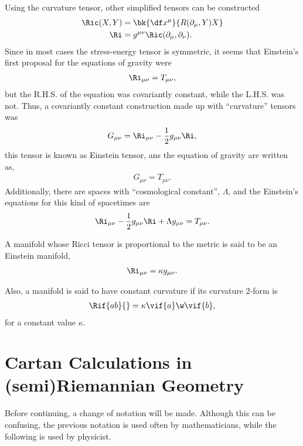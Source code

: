 Using the curvature tensor, other simplified tensors can be constructed
\begin{align}
  \Ric(X,Y) &= \bk{\df x^\mu}{R(\partial_\mu,Y)X}\\
  \Ri &= g^{\mu \nu}\Ric(\partial_\mu,\partial_\nu).
\end{align}
Since in most cases the stress-energy tensor is symmetric, it seems that Einstein's first proposal for the equations of gravity were
\begin{align}
  \Ri_{\mu\nu}=T_{\mu\nu},
\end{align}
but the R.H.S. of the equation was covariantly constant, while the L.H.S. was not. Thus, a covariantly constant construction made up with ``curvature'' tensors was
\begin{align}
  G_{\mu\nu} = \Ri_{\mu\nu}-\frac{1}{2}g_{\mu\nu}\Ri,
\end{align}
this tensor is known as Einstein tensor, ans the equation of gravity are written as,
\begin{align}
  G_{\mu\nu}= T_{\mu\nu}.
\end{align}
Additionally, there are spaces with ``cosmological constant'', $\Lambda$, and the Einstein's equations for this kind of spacetimes are
\begin{align}
  \Ri_{\mu\nu}-\frac{1}{2}g_{\mu\nu}\Ri + \Lambda g_{\mu\nu}= T_{\mu\nu}.
\end{align}

A manifold whose Ricci tensor is proportional to the metric is said to be an Einstein manifold,
\begin{align}
  \Ri_{\mu\nu} = \kappa g_{\mu\nu}.
\end{align}

Also, a manifold is said to have constant curvature if its curvature 2-form is
\begin{align}
  \Rif{ab}{} = \kappa\vif{a}\w\vif{b},
\end{align}
for a constant value $\kappa$.




\chapter{Cartan Calculations in (semi)Riemannian Geometry}

Before continuing, a change of notation will be made. Although this can be confusing, the previous notation is used often by mathematicians, while the following is used by physicist.


